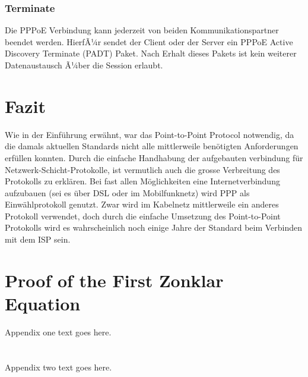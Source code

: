 \documentclass[journal]{IEEEtran}
\begin{document}
\subsubsection{Terminate}
Die PPPoE Verbindung kann jederzeit von beiden Kommunikationspartner beendet werden. HierfÃ¼r sendet
der Client oder der Server ein PPPoE Active Discovery Terminate (PADT) Paket. Nach Erhalt dieses
Pakets ist kein weiterer Datenaustausch Ã¼ber die Session erlaubt.
%


\section{Fazit} 
Wie in der Einf\"uhrung erw\"ahnt, war das Point-to-Point Protocol notwendig, da die damals aktuellen Standards nicht alle mittlerweile ben\"otigten Anforderungen erf\"ullen konnten. Durch die einfache Handhabung der aufgebauten verbindung f\"ur Netzwerk-Schicht-Protokolle, ist vermutlich auch die grosse Verbreitung des Protokolls zu erkl\"aren. Bei fast allen M\"oglichkeiten eine Internetverbindung aufzubauen (sei es \"uber DSL oder im Mobilfunknetz) wird PPP als Einw\"ahlprotokoll genutzt. Zwar wird im Kabelnetz mittlerweile ein anderes Protokoll verwendet, doch durch die einfache Umsetzung des Point-to-Point Protokolls wird es wahrscheinlich noch einige Jahre der Standard beim Verbinden mit dem ISP sein.

\appendices 
\section{Proof of the First Zonklar Equation} 
Appendix one text goes here. 
\section{} 
Appendix two text goes here. 
\end{document}

